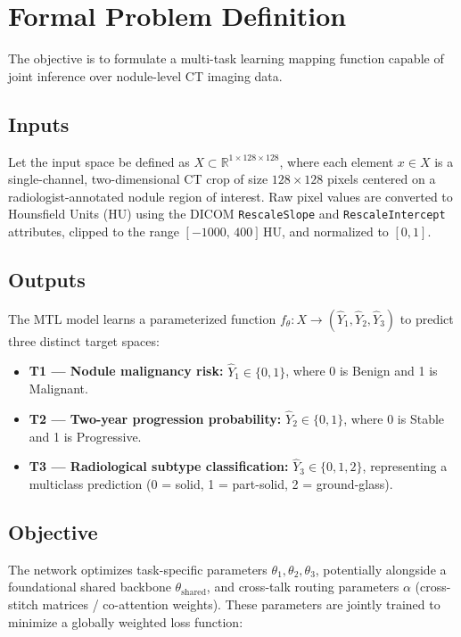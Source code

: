 \section{Formal Problem Definition}
\label{section:formalProblemDefinition}
The objective is to formulate a multi-task learning mapping function capable of joint inference over nodule-level CT imaging data.

\subsection{Inputs}

Let the input space be defined as $X \subset \mathbb{R}^{1 \times 128 \times 128}$, where each element $x \in X$ is a single-channel, two-dimensional CT crop of size $128 \times 128$ pixels centered on a radiologist-annotated nodule region of interest. Raw pixel values are converted to Hounsfield Units (HU) using the DICOM \texttt{RescaleSlope} and \texttt{RescaleIntercept} attributes, clipped to the range $[-1000,\,400]$\,HU, and normalized to $[0, 1]$.

\subsection{Outputs}
The MTL model learns a parameterized function $f_\theta: X \rightarrow (\hat{Y}_1, \hat{Y}_2, \hat{Y}_3)$
 to predict three distinct target spaces:

\begin{itemize}
  \item \textbf{T1 --- Nodule malignancy risk:} $\hat{Y}_1 \in \{0, 1\}$, where 0 is Benign and 1 is Malignant.
  \item \textbf{T2 --- Two-year progression probability:} $\hat{Y}_2 \in \{0, 1\}$, where 0 is Stable and 1 is Progressive.
  \item \textbf{T3 --- Radiological subtype classification:} $\hat{Y}_3 \in \{0, 1, 2\}$, representing a multiclass prediction (0 = solid, 1 = part-solid, 2 = ground-glass).
\end{itemize}

\subsection{Objective}
The network optimizes task-specific parameters $\theta_1, \theta_2, \theta_3$, potentially alongside a foundational shared backbone $\theta_{\mathrm{shared}}$, and cross-talk routing parameters $\alpha$ (cross-stitch matrices / co-attention weights). These parameters are jointly trained to minimize a globally weighted loss function:

